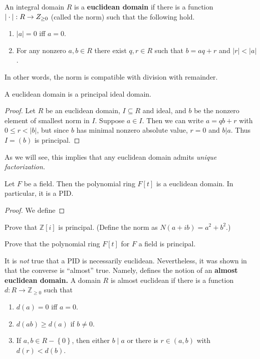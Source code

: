 \begin{definition}
An integral domain $R$ is a \textbf{euclidean domain} if there is a function
$|\cdot |:R\to \mathbb \mathbb{Z}_{\geq 0}$ (called the norm) such that the following hold.
\begin{enumerate}
\item $|a|=0$ iff $a=0$.
\item For any nonzero $a,b\in R$ there exist $q,r\in R$ such that $b=aq+r$ and $|r|<|a|$.
\end{enumerate}
In other words, the norm is compatible with division with remainder.
\end{definition}
\begin{theorem}
A euclidean domain is a principal ideal domain.
\end{theorem}
\begin{proof}
Let $R$ be an euclidean domain, $I\subseteq R$ and ideal, and $b$ be the nonzero element of smallest norm in $I$.
Suppose $ a\in I$. Then we can write $ a = qb + r$ with $ 0\leq r < |b|$, but since $ b$ has minimal nonzero absolute value, $ r = 0$ and $ b|a$. Thus $ I=(b)$ is principal.
\end{proof}


As we will see, this implies that any euclidean domain admits \emph{unique
factorization.}

\begin{proposition} \label{polyringED} 
Let $F$ be a field. Then the polynomial ring $F[t]$ is a euclidean domain. 
In particular, it is a PID.
\end{proposition} 
\begin{proof} 
We define \add{} 
\end{proof} 


\begin{exercise} \label{gaussianintegersareprincipal}
Prove that $\mathbb{Z}[i]$ is principal. 
(Define the norm as $N(a+ib) = a^2 + b^2$.)
\end{exercise} 

\begin{exercise} \label{polyringisprincipal}
Prove that the polynomial ring $F[t]$ for $F$ a field is principal. 
\end{exercise} 


It is \emph{not} true that a PID is necessarily euclidean. Nevertheless, it
was shown in \cite{Gre97} that the converse is ``almost'' true. Namely,
\cite{Gre97} defines the notion of an \textbf{almost euclidean domain.}
A domain $R$ is almost euclidean if there is a function $d: R \to
\mathbb{Z}_{\geq 0}$ such that
\begin{enumerate}
\item $d(a) = 0$ iff $a = 0$. 
\item $d(ab) \geq d(a)$ if $b \neq 0$.
\item  If $a,b \in R - \left\{0\right\}$, then either $b \mid a$ or there is 
$r \in (a,b)$ with $d(r)<d(b)$.
\end{enumerate}

